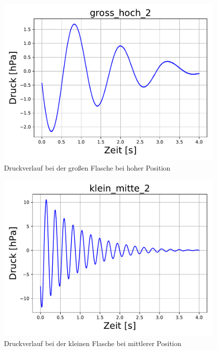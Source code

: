 \documentclass[a4paper, 11pt]{article}
\begin{document}
\begin{figure}[H]
	\centering
	\includegraphics[scale=0.4]{../Plots/gross_hoch_2.pdf}
	\caption{Druckverlauf bei der großen Flasche bei hoher Position}
\end{figure}

\begin{figure}[H]
	\centering
	\includegraphics[scale=0.4]{../Plots/klein_mitte_2.pdf}
	\caption{Druckverlauf bei der kleinen Flasche bei mittlerer Position}
\end{figure}
\end{document}
